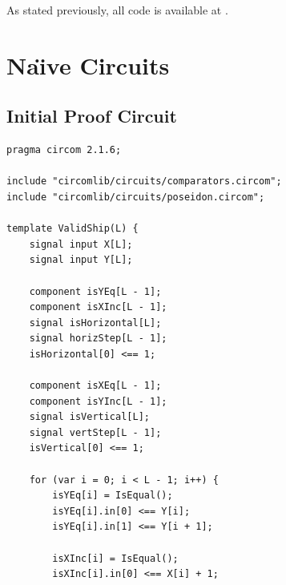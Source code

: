 As stated previously, all code is available at  \cite{zkBattleship}.

\section{Na{\"\i}ve Circuits}

\subsection{Initial Proof Circuit}
\label{subsec:initialProofCircuit}

\begin{listing}[H]
    \ContinuedFloat*
    \begin{verbatim}
pragma circom 2.1.6;

include "circomlib/circuits/comparators.circom";
include "circomlib/circuits/poseidon.circom";

template ValidShip(L) {
    signal input X[L];
    signal input Y[L];

    component isYEq[L - 1];
    component isXInc[L - 1];
    signal isHorizontal[L];
    signal horizStep[L - 1];
    isHorizontal[0] <== 1;

    component isXEq[L - 1];
    component isYInc[L - 1];
    signal isVertical[L];
    signal vertStep[L - 1];
    isVertical[0] <== 1;

    for (var i = 0; i < L - 1; i++) {
        isYEq[i] = IsEqual();
        isYEq[i].in[0] <== Y[i];
        isYEq[i].in[1] <== Y[i + 1];

        isXInc[i] = IsEqual();
        isXInc[i].in[0] <== X[i] + 1;
    \end{verbatim}
    \caption{Na{\"\i}ve commitment for two coordinates.}
    \label{lst:initialProofCircuitNaiveA}
\end{listing}

